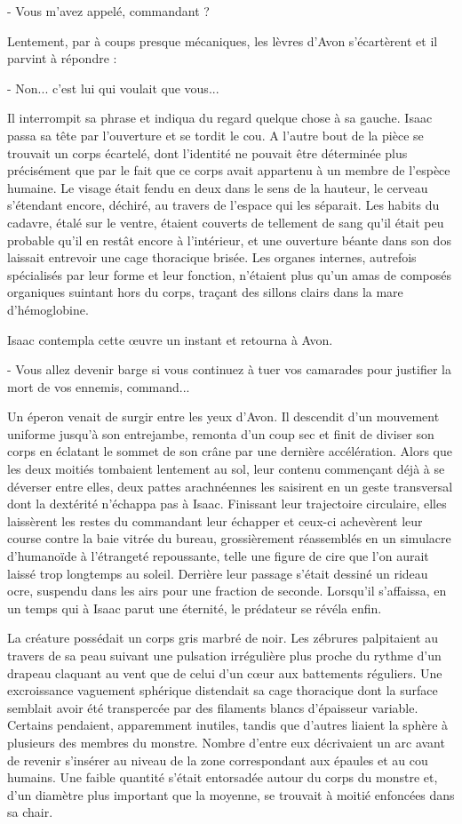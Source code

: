 \documentclass[12pt]{book}
\begin{document}
- Vous m'avez appelé, commandant ?


Lentement, par à coups presque mécaniques, les lèvres d'Avon s'écartèrent et il parvint à répondre :


- Non... c'est lui qui voulait que vous...


Il interrompit sa phrase et indiqua du regard quelque chose à sa gauche. Isaac passa sa tête par l'ouverture et se tordit le cou. A l'autre bout de la pièce se trouvait un corps écartelé, dont l'identité ne pouvait être déterminée plus précisément que par le fait que ce corps avait appartenu à un membre de l'espèce humaine. Le visage était fendu en deux dans le sens de la hauteur, le cerveau s'étendant encore, déchiré, au travers de l'espace qui les séparait. Les habits du cadavre, étalé sur le ventre, étaient couverts de tellement de sang qu'il était peu probable qu'il en restât encore à l'intérieur, et une ouverture béante dans son dos laissait entrevoir une cage thoracique brisée. Les organes internes, autrefois spécialisés par leur forme et leur fonction, n'étaient plus qu'un amas de composés organiques suintant hors du corps, traçant des sillons clairs dans la mare d'hémoglobine.


Isaac contempla cette œuvre un instant et retourna à Avon.


- Vous allez devenir barge si vous continuez à tuer vos camarades pour justifier la mort de vos ennemis, command...


Un éperon venait de surgir entre les yeux d'Avon. Il descendit d'un mouvement uniforme jusqu'à son entrejambe, remonta d'un coup sec et finit de diviser son corps en éclatant le sommet de son crâne par une dernière accélération. Alors que les deux moitiés tombaient lentement au sol, leur contenu commençant déjà à se déverser entre elles, deux pattes arachnéennes les saisirent en un geste transversal dont la dextérité n'échappa pas à Isaac. Finissant leur trajectoire circulaire, elles laissèrent les restes du commandant leur échapper et ceux-ci achevèrent leur course contre la baie vitrée du bureau, grossièrement réassemblés en un simulacre d'humanoïde à l’étrangeté repoussante, telle une figure de cire que l'on aurait laissé trop longtemps au soleil. Derrière leur passage s'était dessiné un rideau ocre, suspendu dans les airs pour une fraction de seconde. Lorsqu'il s'affaissa, en un temps qui à Isaac parut une éternité, le prédateur se révéla enfin.


La créature possédait un corps gris marbré de noir. Les zébrures palpitaient au travers de sa peau suivant une pulsation irrégulière plus proche du rythme d'un drapeau claquant au vent que de celui d'un cœur aux battements réguliers. Une excroissance vaguement sphérique distendait sa cage thoracique dont la surface semblait avoir été transpercée par des filaments blancs d'épaisseur variable. Certains pendaient, apparemment inutiles, tandis que d'autres liaient la sphère à plusieurs des membres du monstre. Nombre d'entre eux décrivaient un arc avant de revenir s'insérer au niveau de la zone correspondant aux épaules et au cou humains. Une faible quantité s'était entorsadée autour du corps du monstre et, d'un diamètre plus important que la moyenne, se trouvait à moitié enfoncées dans sa chair.
\end{document}

